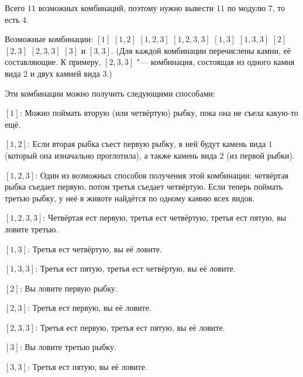 Всего $11$ возможных комбинаций, поэтому нужно вывести $11$ по модулю $7$, то
есть $4$.

Возможные комбинации: $[1]$ $[1,2]$ $[1,2,3]$ $[1,2,3,3]$ $[1,3]$ $[1,3,3]$
$[2]$ $[2,3]$ $[2,3,3]$ $[3]$ и $[3,3]$. (Для каждой комбинации перечислены
камни, её составляющие. К примеру, $[2,3,3]$ "--- комбинация, состоящая из
одного камня вида $2$ и двух камней вида $3$.)

Эти комбинации можно получить следующими способами:

\begin{shortitems}
  \item $[1]$: Можно поймать вторую (или четвёртую) рыбку, пока она не съела
    какую-то ещё.
  \item $[1,2]$: Если вторая рыбка съест первую рыбку, в ней будут камень вида
    $1$ (который она изначально проглотила), а также камень вида $2$ (из первой
    рыбки).
  \item $[1,2,3]$: Один из возможных способов получения этой комбинации:
    четвёртая рыбка съедает первую, потом третья съедает четвёртую. Если теперь
    поймать третью рыбку, у неё в животе найдётся по одному камню всех видов.
  \item $[1,2,3,3]$: Четвёртая ест первую, третья ест четвёртую, третья ест
    пятую, вы ловите третью.
  \item $[1,3]$: Третья ест четвёртую, вы её ловите.
  \item $[1,3,3]$: Третья ест пятую, третья ест четвёртую, вы её ловите.
  \item $[2]$: Вы ловите первую рыбку.
  \item $[2,3]$: Третья ест первую, вы её ловите.
  \item $[2,3,3]$: Третья ест первую, третья ест пятую, вы её ловите.
  \item $[3]$: Вы ловите третью рыбку.
  \item $[3,3]$: Третья ест пятую, вы её ловите.
\end{shortitems}
